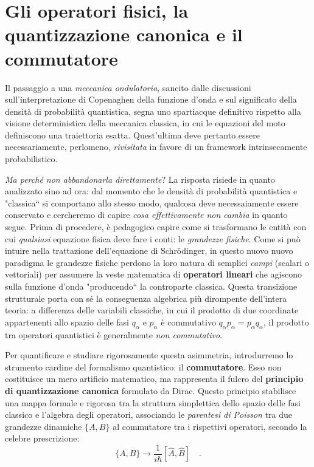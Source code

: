 
\chapter{Gli operatori fisici, la quantizzazione canonica e il commutatore}
Il passaggio a una \emph{meccanica ondulatoria}, sancito dalle discussioni sull'interpretazione di Copenaghen della funzione d'onda e sul significato della densità di probabilità quantistica, segna uno spartiacque definitivo rispetto alla visione deterministica della meccanica classica, in cui le equazioni del moto definiscono una traiettoria esatta. Quest'ultima deve pertanto essere necessariamente, perlomeno, \emph{rivisitata} in favore di un framework intrinsecamente probabilistico. 

\guillemetleft\emph{Ma perché non abbandonarla direttamente}\guillemetright? La risposta risiede in quanto analizzato sino ad ora: dal momento che le densità di probabilità quantistica e "classica“ si comportano allo stesso modo, qualcosa deve necessaiamente essere conservato e cercheremo di capire \emph{cosa effettivamente non cambia} in quanto segue.  
Prima di procedere, è pedagogico capire come si trasformano le entità con cui \emph{qualsiasi} equazione fisica deve fare i conti: le \emph{grandezze fisiche}. Come si può intuire nella trattazione dell'equazione di Schrödinger, in questo nuovo nuovo paradigma le grandezze fisiche perdono la loro natura di semplici \emph{campi} (scalari o vettoriali) per assumere la veste matematica di \textbf{operatori lineari} che agiscono sulla funzione d'onda "producendo“ la controparte classica. Questa transizione strutturale porta con sé la conseguenza algebrica più dirompente dell'intera teoria: a differenza delle variabili classiche, in cui il prodotto di due coordinate appartenenti allo spazio delle fasi $q_\alpha$ e $p_\alpha$ è commutativo $q_\alpha p_\alpha = p_\alpha q_\alpha$, il prodotto tra operatori quantistici è generalmente \emph{non commutativo}.

Per quantificare e studiare rigorosamente questa asimmetria, introdurremo lo strumento cardine del formalismo quantistico: il \textbf{commutatore}. Esso non costituisce un mero artificio matematico, ma rappresenta il fulcro del \textbf{principio di quantizzazione canonica} formulato da Dirac. Questo principio stabilisce una mappa formale e rigorosa tra la struttura simplettica dello spazio delle fasi classico e l'algebra degli operatori, associando le \emph{parentesi di Poisson} tra due grandezze dinamiche $\{A, B\}$ al commutatore tra i rispettivi operatori, secondo la celebre prescrizione:
\begin{equation}
    \{A, B\} \rightarrow \frac{1}{i\hbar}[\hat{A}, \hat{B}] \quad.
\end{equation}


